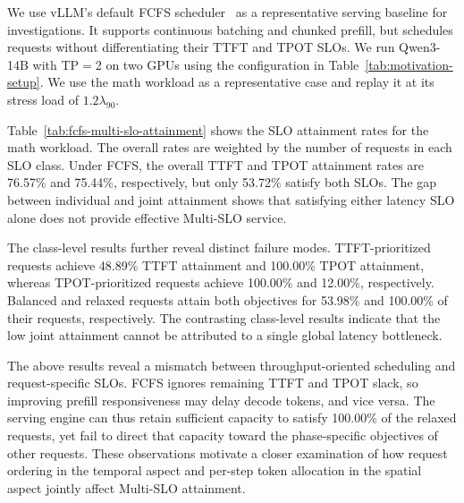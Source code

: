 We use vLLM's default FCFS scheduler~\cite{kwon2023vllm} as a representative serving baseline for investigations.
It supports continuous batching and chunked prefill, but schedules requests without differentiating their TTFT and TPOT SLOs.
We run Qwen3-14B with TP${}={}$2 on two GPUs using the configuration in Table~\ref{tab:motivation-setup}.
We use the math workload as a representative case and replay it at its stress load of $1.2\lambda_{90}$.

Table~\ref{tab:fcfs-multi-slo-attainment} shows the SLO attainment rates for the math workload.
The overall rates are weighted by the number of requests in each SLO class.
Under FCFS, the overall TTFT and TPOT attainment rates are 76.57\% and 75.44\%, respectively, but only 53.72\% satisfy both SLOs.
The gap between individual and joint attainment shows that satisfying either latency SLO alone does not provide effective Multi-SLO service.

The class-level results further reveal distinct failure modes.
TTFT-prioritized requests achieve 48.89\% TTFT attainment and 100.00\% TPOT attainment, whereas TPOT-prioritized requests achieve 100.00\% and 12.00\%, respectively.
Balanced and relaxed requests attain both objectives for 53.98\% and 100.00\% of their requests, respectively.
The contrasting class-level results indicate that the low joint attainment cannot be attributed to a single global latency bottleneck.

The above results reveal a mismatch between throughput-oriented scheduling and request-specific SLOs.
FCFS ignores remaining TTFT and TPOT slack, so improving prefill responsiveness may delay decode tokens, and vice versa.
The serving engine can thus retain sufficient capacity to satisfy 100.00\% of the relaxed requests, yet fail to direct that capacity toward the phase-specific objectives of other requests.
These observations motivate a closer examination of how request ordering in the temporal aspect and per-step token allocation in the spatial aspect jointly affect Multi-SLO attainment.


